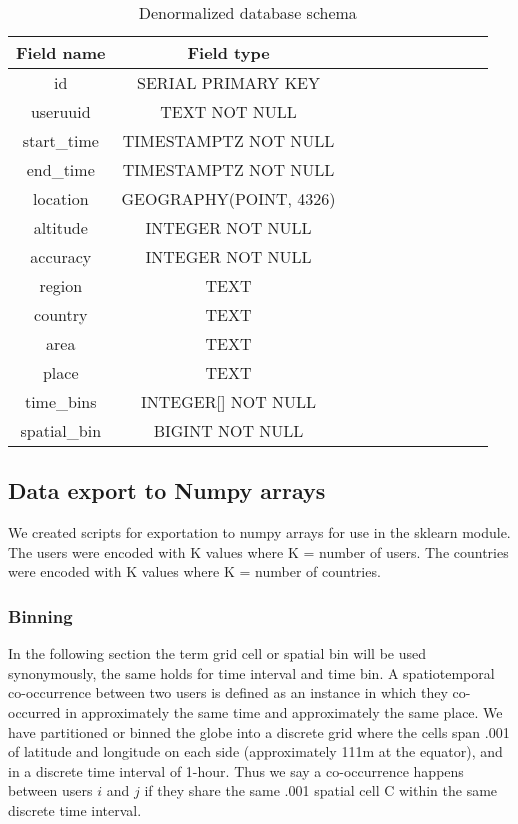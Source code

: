 \begin{table}[htbp]
\centering

\begin{tabular}{|c|c|c|c|c|c|c|c|c|c|c|}
\hline
\textbf{Field name} & \textbf{Field type}    \\
\hline
id                  & SERIAL PRIMARY KEY     \\
\hline
useruuid            & TEXT NOT NULL          \\
\hline
start\_time         & TIMESTAMPTZ NOT NULL   \\
\hline
end\_time           & TIMESTAMPTZ NOT NULL   \\
\hline
location            & GEOGRAPHY(POINT, 4326) \\
\hline
altitude            & INTEGER NOT NULL       \\
\hline
accuracy            & INTEGER NOT NULL       \\
\hline
region              & TEXT                   \\
\hline
country             & TEXT                   \\
\hline
area                & TEXT                   \\
\hline
place               & TEXT                   \\
\hline
time\_bins          & INTEGER{[}{]} NOT NULL \\
\hline
spatial\_bin        & BIGINT NOT NULL        \\
\hline
\end{tabular}
\caption{Denormalized database schema}
\label{table:schema_denormalized}
\end{table}
\subsection{Data export to Numpy arrays}
We created scripts for exportation to numpy arrays for use in the sklearn module. The users were encoded with K values where K = number of users. The countries were encoded with K values where K = number of countries.

\subsubsection{Binning} \label{ssec:binning}
In the following section the term grid cell or spatial bin will be used synonymously, the same holds for time interval and time bin.
A spatiotemporal co-occurrence between two users is defined as an instance in which they co-occurred in approximately the same time and approximately the same place.
We have partitioned or binned the globe into a discrete grid where the cells span .001{\degree} of latitude and longitude on each side (approximately 111m at the equator), and in a discrete time interval of 1-hour.
Thus we say a co-occurrence happens between users $i$ and $j$ if they share the same .001{\degree} spatial cell C within the same discrete time interval.


